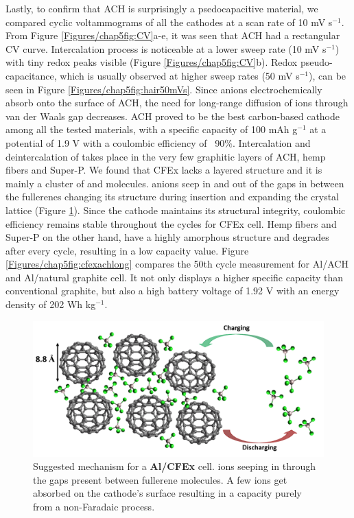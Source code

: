 Lastly, to confirm that ACH is surprisingly a psedocapacitive material, we compared cyclic voltammograms of all the cathodes at a scan rate of 10 mV s$^{-1}$. From Figure \ref{Figures/chap5fig:CV}a-e, it was seen that ACH had a rectangular CV curve. Intercalation process is noticeable at a lower sweep rate (10 mV s$^{-1}$) with tiny redox peaks visible (Figure \ref{Figures/chap5fig:CV}b). Redox pseudo-capacitance, which is usually observed at higher sweep rates (50 mV s$^{-1}$), can be seen in Figure \ref{Figures/chap5fig:hair50mVs}. Since  anions electrochemically absorb onto the surface of ACH, the  need for long-range diffusion of ions through van der Waals gap decreases. 
ACH proved to be the best carbon-based cathode among all the tested materials, with a specific capacity of 100 mAh g$^{-1}$ at a potential of 1.9 V with a coulombic efficiency of ~90$\%$. Intercalation and deintercalation of  takes place in the very few graphitic layers of ACH, hemp fibers and Super-P. We found that CFEx lacks a layered structure and it is mainly a cluster of  and  molecules.  anions seep in and out of the gaps in between the fullerenes changing its structure during insertion and expanding the crystal lattice (Figure \ref{Figures/chap5fig:cfexmech}). Since the cathode maintains its structural integrity, coulombic efficiency remains stable throughout the cycles for CFEx cell. Hemp fibers and Super-P on the other hand, have a highly amorphous structure and degrades after every cycle, resulting in a low capacity value. Figure \ref{Figures/chap5fig:cfexachlong} compares the 50th cycle measurement for Al/ACH and Al/natural graphite cell. It not only displays a higher specific capacity than conventional graphite, but also a high battery voltage of 1.92 V with an energy density of 202 Wh kg$^{-1}$.

 \begin{figure}[tbh!]
  \centering
  \includegraphics[width=\textwidth]{Figures/chap5fig/cfexmech}
    \caption{Suggested mechanism for a \textbf{Al/CFEx} cell.  ions seeping in through the gaps present between fullerene molecules. A few  ions get absorbed on the cathode's surface resulting in a capacity purely from a non-Faradaic process.}
  \label{Figures/chap5fig:cfexmech}
\end{figure}

